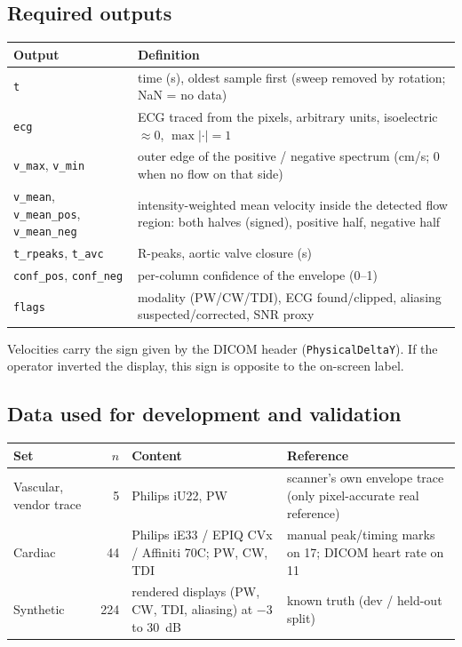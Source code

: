 \documentclass[10pt,a4paper]{article}
\newcommand{\code}[1]{\texttt{\small #1}}
\begin{document}
\subsection{Required outputs}
\begin{center}\small
\begin{tabularx}{\linewidth}{@{}lL@{}}
\toprule
Output & Definition \\ \midrule
\code{t} & time (s), oldest sample first (sweep removed by rotation; NaN = no data) \\
\code{ecg} & ECG traced from the pixels, arbitrary units, isoelectric $\approx0$, $\max|\cdot|=1$ \\
\code{v\_max}, \code{v\_min} & outer edge of the positive / negative spectrum (cm/s; 0 when no flow on that side) \\
\code{v\_mean}, \code{v\_mean\_pos}, \code{v\_mean\_neg} & intensity-weighted mean velocity inside the detected
flow region: both halves (signed), positive half, negative half \\
\code{t\_rpeaks}, \code{t\_avc} & R-peaks, aortic valve closure (s) \\
\code{conf\_pos}, \code{conf\_neg} & per-column confidence of the envelope (0--1) \\
\code{flags} & modality (PW/CW/TDI), ECG found/clipped, aliasing suspected/corrected, SNR proxy \\
\bottomrule
\end{tabularx}
\end{center}
Velocities carry the sign given by the DICOM header (\code{PhysicalDeltaY}). If the operator inverted the
display, this sign is opposite to the on-screen label.

\subsection{Data used for development and validation}
\begin{center}\small
\begin{tabularx}{\linewidth}{@{}lrLL@{}}
\toprule
Set & $n$ & Content & Reference \\ \midrule
Vascular, vendor trace & 5 & Philips iU22, PW & scanner's own envelope trace (only pixel-accurate real reference) \\
Cardiac & 44 & Philips iE33 / EPIQ CVx / Affiniti 70C; PW, CW, TDI & manual peak/timing marks on 17; DICOM heart rate on 11 \\
Synthetic & 224 & rendered displays (PW, CW, TDI, aliasing) at $-3$ to 30~dB & known truth (dev / held-out split) \\
\bottomrule
\end{tabularx}
\end{center}
\end{document}
